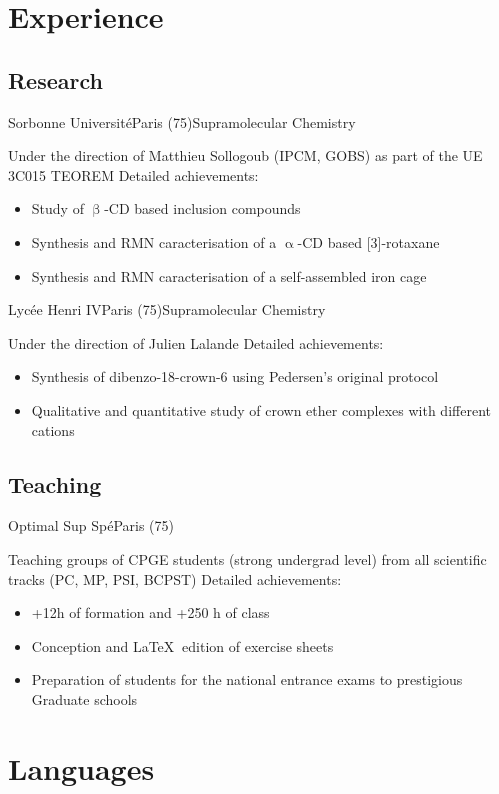 \documentclass[11pt,a4paper,sans]{moderncv}
\begin{document}
\section{Experience}
%
%
\subsection{Research}
%
%
%
{Sorbonne Université}{Paris (75)}{Supramolecular Chemistry}%
{Under the direction of Matthieu Sollogoub (IPCM, GOBS) as part of the UE 3C015 TEOREM\newline{}%
Detailed achievements:%
\begin{itemize}%
\item Study of $\upbeta$-CD based inclusion compounds
\item Synthesis and RMN caracterisation of a $\upalpha$-CD based [3]-rotaxane
\item Synthesis and RMN caracterisation of a self-assembled iron cage
\end{itemize}
}
%
%
%
{Lycée Henri IV}{Paris (75)}{Supramolecular Chemistry}%
{Under the direction of Julien Lalande \newline{}%
Detailed achievements:%
\begin{itemize}%
\item Synthesis of dibenzo-18-crown-6 using Pedersen's original protocol
\item Qualitative and quantitative study of crown ether complexes with different cations
\end{itemize}
}
%
%
%
\subsection{Teaching}
%
{Optimal Sup Spé}{Paris (75)}{}%
{Teaching groups of CPGE students (strong undergrad level) from all scientific tracks (PC, MP, PSI, BCPST)\newline{}%
Detailed achievements:%
\begin{itemize}%
\item +12h of formation and +250 h of class
\item Conception and {\LaTeX} $~$edition of exercise sheets
\item Preparation of students for the national entrance exams to prestigious Graduate schools
\end{itemize}
}
%
%
%
\section{Languages}
%
%
%
\end{document}
